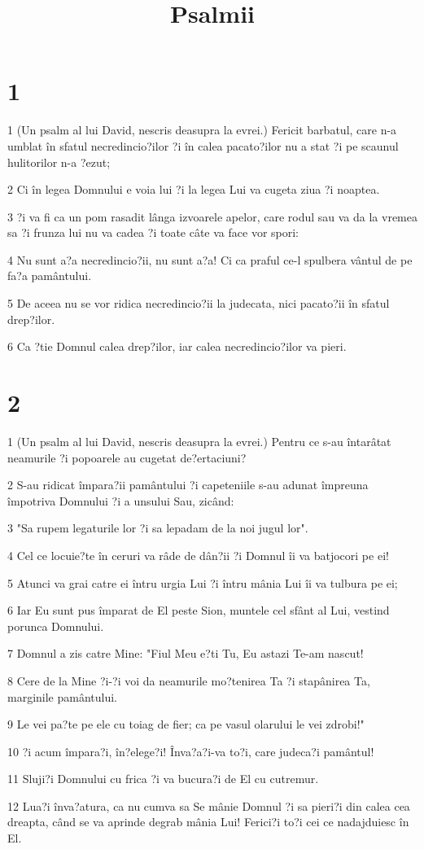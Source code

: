 

\title{Psalmii}


\chapter{1}

\par 1 (Un psalm al lui David, nescris deasupra la evrei.) Fericit barbatul, care n-a umblat în sfatul necredincio?ilor ?i în calea pacato?ilor nu a stat ?i pe scaunul hulitorilor n-a ?ezut;
\par 2 Ci în legea Domnului e voia lui ?i la legea Lui va cugeta ziua ?i noaptea.
\par 3 ?i va fi ca un pom rasadit lânga izvoarele apelor, care rodul sau va da la vremea sa ?i frunza lui nu va cadea ?i toate câte va face vor spori:
\par 4 Nu sunt a?a necredincio?ii, nu sunt a?a! Ci ca praful ce-l spulbera vântul de pe fa?a pamântului.
\par 5 De aceea nu se vor ridica necredincio?ii la judecata, nici pacato?ii în sfatul drep?ilor.
\par 6 Ca ?tie Domnul calea drep?ilor, iar calea necredincio?ilor va pieri.

\chapter{2}

\par 1 (Un psalm al lui David, nescris deasupra la evrei.) Pentru ce s-au întarâtat neamurile ?i popoarele au cugetat de?ertaciuni?
\par 2 S-au ridicat împara?ii pamântului ?i capeteniile s-au adunat împreuna împotriva Domnului ?i a unsului Sau, zicând:
\par 3 "Sa rupem legaturile lor ?i sa lepadam de la noi jugul lor".
\par 4 Cel ce locuie?te în ceruri va râde de dân?ii ?i Domnul îi va batjocori pe ei!
\par 5 Atunci va grai catre ei întru urgia Lui ?i întru mânia Lui îi va tulbura pe ei;
\par 6 Iar Eu sunt pus împarat de El peste Sion, muntele cel sfânt al Lui, vestind porunca Domnului.
\par 7 Domnul a zis catre Mine: "Fiul Meu e?ti Tu, Eu astazi Te-am nascut!
\par 8 Cere de la Mine ?i-?i voi da neamurile mo?tenirea Ta ?i stapânirea Ta, marginile pamântului.
\par 9 Le vei pa?te pe ele cu toiag de fier; ca pe vasul olarului le vei zdrobi!"
\par 10 ?i acum împara?i, în?elege?i! Înva?a?i-va to?i, care judeca?i pamântul!
\par 11 Sluji?i Domnului cu frica ?i va bucura?i de El cu cutremur.
\par 12 Lua?i înva?atura, ca nu cumva sa Se mânie Domnul ?i sa pieri?i din calea cea dreapta, când se va aprinde degrab mânia Lui! Ferici?i to?i cei ce nadajduiesc în El.

